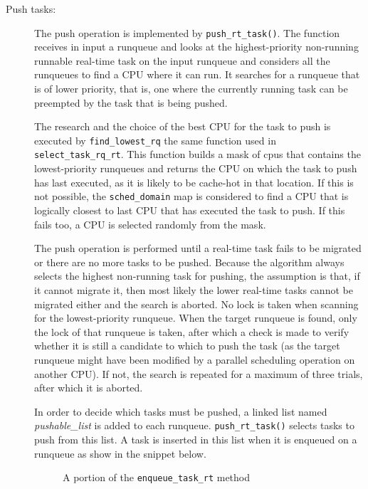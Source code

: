 \begin{description}
\item[Push tasks:] The push operation is implemented by \texttt{push\_rt\_task()}. The function receives in input a runqueue and looks at the 
highest-priority non-running runnable real-time task on the input runqueue and
considers all the runqueues to find a CPU where it can run. It 
searches for a runqueue that is of lower priority, that is, one where the currently running task can be preempted by the task that is being pushed. 

The research and the choice of the best CPU for the task to push is executed by \texttt{find\_lowest\_rq} the same function used in 
\texttt{select\_task\_rq\_rt}. This function builds a mask of cpus that contains
the lowest-priority runqueues and returns the CPU on which the task 
to push has last executed, as it is likely to be cache-hot in that location. If this is not possible, the \texttt{sched\_domain} map is considered 
to find a CPU that is logically closest to last CPU that has executed the task
to push. If this fails too, a CPU is selected randomly from the mask.

The push operation is performed until a real-time task fails to be migrated or there are no more tasks to be pushed. Because the algorithm always 
selects the highest non-running task for pushing, the assumption is that, if it cannot migrate it, then most likely the lower real-time tasks cannot 
be migrated either and the search is aborted. No lock is taken when scanning for the lowest-priority runqueue. When the target runqueue is found, 
only the lock of that runqueue is taken, after which a check is made to verify whether it is still a candidate to which to push the task (as the 
target runqueue might have been modified by a parallel scheduling operation on another CPU). If not, the search is repeated for a maximum of three 
trials, after which it is aborted. 

In order to decide which tasks must be pushed, a linked list named \textit{pushable\_list} is added to each runqueue. \texttt{push\_rt\_task()} 
selects tasks to push from this list. A task is inserted in this list when it is enqueued on a runqueue as show in the snippet below.

\begin{figure}[h]
  \lstset{basicstyle=\footnotesize, language=c, captionpos=b, frame=single, label=lis:enqueue_push}
  
  \caption{A portion of the \texttt{enqueue\_task\_rt} method}
  \label{code:enqueue_push}
\end{figure}


\end{description}
